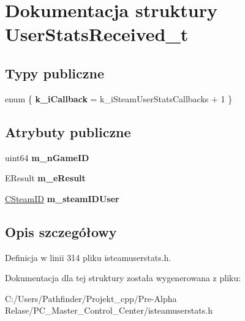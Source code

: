 \hypertarget{struct_user_stats_received__t}{}\section{Dokumentacja struktury User\+Stats\+Received\+\_\+t}
\label{struct_user_stats_received__t}
\subsection*{Typy publiczne}
\begin{DoxyCompactItemize}
\item 
\mbox{\label{struct_user_stats_received__t_a13a8a082f5c55b967efba61bd264c70c}} 
enum \{ {\bfseries k\+\_\+i\+Callback} = k\+\_\+i\+Steam\+User\+Stats\+Callbacks + 1
 \}
\end{DoxyCompactItemize}
\subsection*{Atrybuty publiczne}
\begin{DoxyCompactItemize}
\item 
\mbox{\label{struct_user_stats_received__t_abee16d071fcdbdf406571d3cedea93ad}} 
uint64 {\bfseries m\+\_\+n\+Game\+ID}
\item 
\mbox{\label{struct_user_stats_received__t_a6e261e1d71ecd777a7f76a2a4c193c68}} 
E\+Result {\bfseries m\+\_\+e\+Result}
\item 
\mbox{\label{struct_user_stats_received__t_a2c03e0a8a8c581c06d1193711770f430}} 
\hyperlink{class_c_steam_i_d}{C\+Steam\+ID} {\bfseries m\+\_\+steam\+I\+D\+User}
\end{DoxyCompactItemize}


\subsection{Opis szczegółowy}


Definicja w linii 314 pliku isteamuserstats.\+h.



Dokumentacja dla tej struktury została wygenerowana z pliku\+:\begin{DoxyCompactItemize}
\item 
C\+:/\+Users/\+Pathfinder/\+Projekt\+\_\+cpp/\+Pre-\/\+Alpha Relase/\+P\+C\+\_\+\+Master\+\_\+\+Control\+\_\+\+Center/isteamuserstats.\+h\end{DoxyCompactItemize}
